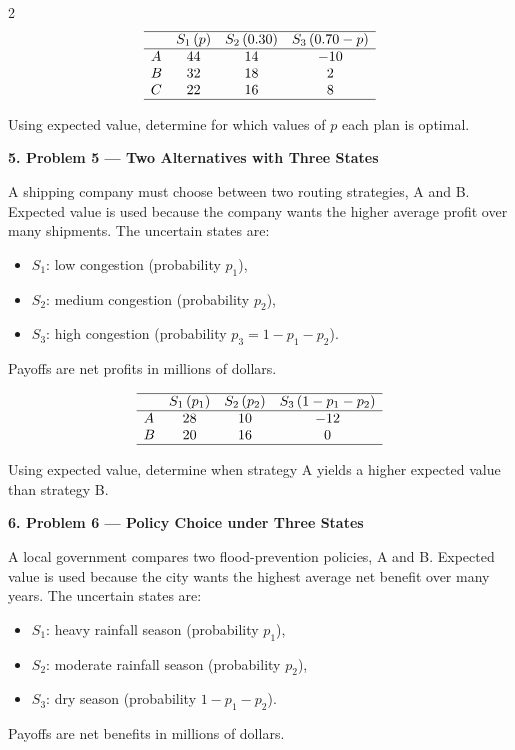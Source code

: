 \documentclass[12pt]{article}
\newcommand{\SubsectionBox}[1]{%
	\noindent\colorbox{gray!30}{%
		\parbox{\linewidth}{\textbf{#1}}%
	}\par\vspace{0.35cm}%
}
\begin{document}
\begin{multicols}{2}
				\[
				\begin{array}{lccc}
					\hline
					& S_1\,(p) & S_2\,(0.30) & S_3\,(0.70-p) \\
					\hline
					A & 44 & 14 & -10 \\
					B & 32 & 18 & 2 \\
					C & 22 & 16 & 8 \\
					\hline
				\end{array}
				\]
				
				Using expected value, determine for which values of \(p\) each plan is optimal.

		\vspace{0.25cm}
		\SubsectionBox{5. Problem 5 --- Two Alternatives with Three States}\vspace{-0.25cm}
		A shipping company must choose between two routing strategies, A and B. Expected value is used because the company wants the higher average profit over many shipments. The uncertain states are:
				\begin{itemize}
					\item \(S_1\): low congestion (probability \(p_1\)),
					\item \(S_2\): medium congestion (probability \(p_2\)),
					\item \(S_3\): high congestion (probability \(p_3=1-p_1-p_2\)).
				\end{itemize}
				Payoffs are net profits in millions of dollars.
				
				\[
				\begin{array}{lccc}
					\hline
					& S_1\,(p_1) & S_2\,(p_2) & S_3\,(1-p_1-p_2) \\
					\hline
					A & 28 & 10 & -12 \\
					B & 20 & 16 & 0 \\
					\hline
				\end{array}
				\]
				
				Using expected value, determine when strategy A yields a higher expected value than strategy B.

		\vspace{0.25cm}
		\SubsectionBox{6. Problem 6 --- Policy Choice under Three States}\vspace{-0.25cm}
		A local government compares two flood-prevention policies, A and B. Expected value is used because the city wants the highest average net benefit over many years. The uncertain states are:
				\begin{itemize}
					\item \(S_1\): heavy rainfall season (probability \(p_1\)),
					\item \(S_2\): moderate rainfall season (probability \(p_2\)),
					\item \(S_3\): dry season (probability \(1-p_1-p_2\)).
				\end{itemize}
				Payoffs are net benefits in millions of dollars.
				

\end{multicols}
\end{document}
